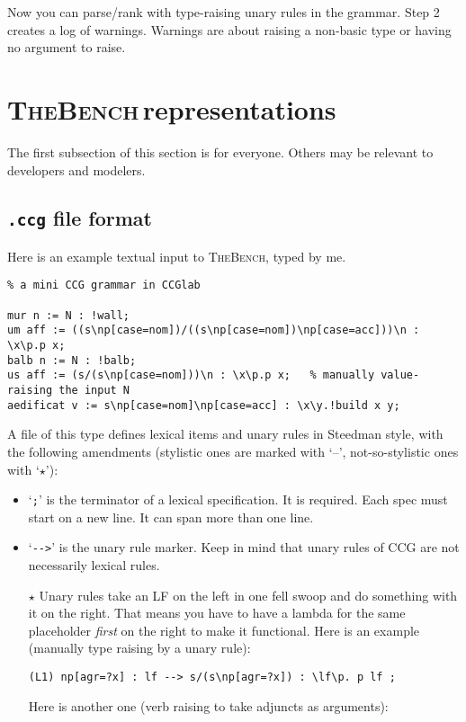 \documentclass[11pt]{article}
\newcommand{\tool}{\textsc{TheBench}}
\newcommand{\llabel}{--}
\begin{document}
{Now you can parse/rank with type-raising unary rules in the grammar. {Step 2 creates a log of warnings. Warnings are about raising a non-basic type or having no argument to raise.}

\section{\tool\,representations}\label{sec:formats}

The first subsection of this section is for everyone. Others may be relevant to developers and modelers.

\subsection{\texttt{.ccg} file format}
Here is an example textual input to \tool, typed by me.

{\footnotesize\begin{verbatim}
% a mini CCG grammar in CCGlab

mur n := N : !wall;
um aff := ((s\np[case=nom])/((s\np[case=nom])\np[case=acc]))\n : \x\p.p x;
balb n := N : !balb;
us aff := (s/(s\np[case=nom]))\n : \x\p.p x;   % manually value-raising the input N
aedificat v := s\np[case=nom]\np[case=acc] : \x\y.!build x y;
\end{verbatim}}

\noindent A file of this type defines lexical items and unary rules in Steedman style, with the following  amendments
(stylistic ones are marked with `\llabel', not-so-stylistic ones  with `$\star$'):
\begin{itemize}
\setlength{\itemsep}{1pt}
\setlength{\parskip}{0pt}
\setlength{\parsep}{0pt} 
\item  `\verb|;|'  is the terminator of a lexical specification. It is required. Each spec must start on a new line. It can span more than one line.
\item  `\verb|-->|' is the unary rule marker. Keep in mind that unary rules
of CCG are not necessarily lexical rules.
\item[$\star$] {Unary rules take an LF on the left in one fell swoop and
do something with it on the right. That means you have to have a
lambda for the same placeholder \emph{first} on the right to make it functional}. Here is an example (manually type raising by a unary rule):

\verb|(L1) np[agr=?x] : lf --> s/(s\np[agr=?x]) : \lf\p. p lf ;|

{Here is another one (verb raising to take adjuncts as arguments):}


\end{itemize}}
\end{document}
